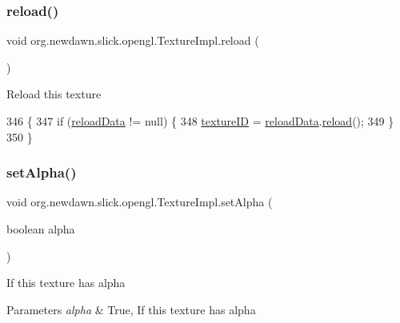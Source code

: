 \subsubsection{\texorpdfstring{reload()}{reload()}}
{\footnotesize\ttfamily void org.\+newdawn.\+slick.\+opengl.\+Texture\+Impl.\+reload (\begin{DoxyParamCaption}{ }\end{DoxyParamCaption})\hspace{0.3cm}{\ttfamily [inline]}}

Reload this texture 
\begin{DoxyCode}
346                          \{
347         \textcolor{keywordflow}{if} (\mbox{\hyperlink{classorg_1_1newdawn_1_1slick_1_1opengl_1_1_texture_impl_ad18e1094b8d017aba62758130629ebbc}{reloadData}} != null) \{
348             \mbox{\hyperlink{classorg_1_1newdawn_1_1slick_1_1opengl_1_1_texture_impl_a6dba48b815f4fc5a37e9c4390f349c9e}{textureID}} = \mbox{\hyperlink{classorg_1_1newdawn_1_1slick_1_1opengl_1_1_texture_impl_ad18e1094b8d017aba62758130629ebbc}{reloadData}}.\mbox{\hyperlink{classorg_1_1newdawn_1_1slick_1_1opengl_1_1_texture_impl_1_1_reload_data_a9aa3b4822b2ecf2bdd34e0e5d1df9c46}{reload}}();
349         \}
350     \}
\end{DoxyCode}
\mbox{\label{classorg_1_1newdawn_1_1slick_1_1opengl_1_1_texture_impl_a2a99120ac7e938687b55606114ee5e21}} 
\subsubsection{\texorpdfstring{set\+Alpha()}{setAlpha()}}
{\footnotesize\ttfamily void org.\+newdawn.\+slick.\+opengl.\+Texture\+Impl.\+set\+Alpha (\begin{DoxyParamCaption}\item[{boolean}]{alpha }\end{DoxyParamCaption})\hspace{0.3cm}{\ttfamily [inline]}}

If this texture has alpha


\begin{DoxyParams}{Parameters}
{\em alpha} & True, If this texture has alpha \\
\hline
\end{DoxyParams}


